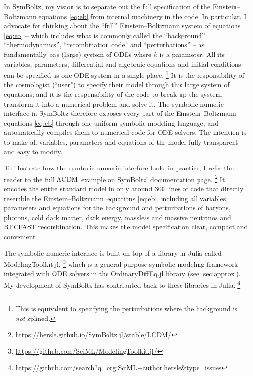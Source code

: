 \documentclass[USenglish, thumbmarks]{uiophdthesis} %
\newcommand\LCDM{\ensuremath{\mathrm{\Lambda CDM}}}
\newcommand\EB{Einstein--Boltzmann}
\begin{document}
In SymBoltz, my vision is to separate out the full specification of the \EB{} equations \eqref{eq:eb}
from internal machinery in the code.
In particular, I advocate for thinking about the \enquote{full} \EB{} system of equations \eqref{eq:eb}
-- which includes what is commonly called the \enquote{background}, \enquote{thermodynamics}, \enquote{recombination code} and \enquote{perturbations} --
as fundamentally \emph{one} (large) system of ODEs where $k$ is a parameter.
All its variables, parameters, differential and algebraic equations and initial conditions can be specified as one ODE system in a single place.%
\footnote{This is equivalent to specifying the perturbations where the background is \emph{not} splined.}
It is the responsibility of the cosmologist (\enquote{user}) to specify their model through this large system of equations;
and it is the responsibility of the code to break up the system, transform it into a numerical problem and solve it.
The symbolic-numeric interface in SymBoltz
therefore exposes every part of the \EB{} equations \eqref{eq:eb}
through one uniform symbolic modeling language,
and automatically compiles them to numerical code for ODE solvers.
The intention is to make all variables, parameters and equations of the model fully transparent and easy to modify.

To illustrate how the symbolic-numeric interface looks in practice,
I refer the reader to the full \LCDM{} example on SymBoltz' documentation page.%
\footnote{\url{https://hersle.github.io/SymBoltz.jl/stable/LCDM/}}
It encodes the entire standard model in only around 300 lines of code
that directly resemble the \EB{} equations \eqref{eq:eb},
including all variables, parameters and equations for the background and perturbations of
baryons, photons, cold dark matter, dark energy, massless and massive neutrinos and RECFAST recombination.
This makes the model specification clear, compact and convenient.

The symbolic-numeric interface is built on top of a library in Julia called ModelingToolkit.jl,%
\footnote{\url{https://github.com/SciML/ModelingToolkit.jl/}}
which is a general-purpose symbolic modeling framework integrated with ODE solvers in the OrdinaryDiffEq.jl library (see \cref{sec:approx}).
My development of SymBoltz has contributed back to these libraries in Julia.%
\footnote{\url{https://github.com/search?q=org:SciML+author:hersle&type=issues}}
\end{document}
